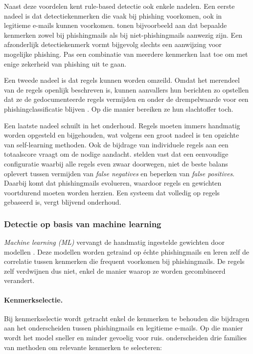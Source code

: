 Naast deze voordelen kent rule-based detectie ook enkele nadelen. Een eerste nadeel is dat detectiekenmerken die vaak bij phishing voorkomen, ook in legitieme e-mails kunnen voorkomen. \textcite{Fette2007} tonen bijvoorbeeld aan dat bepaalde kenmerken zowel bij phishingmails als bij niet-phishingmails aanwezig zijn. Een afzonderlijk detectiekenmerk vormt bijgevolg slechts een aanwijzing voor mogelijke phishing. Pas een combinatie van meerdere kenmerken laat toe om met enige zekerheid van phishing uit te gaan.

Een tweede nadeel is dat regels kunnen worden omzeild. Omdat het merendeel van de regels openlijk beschreven is, kunnen aanvallers hun berichten zo opstellen dat ze de gedocumenteerde regels vermijden en onder de drempelwaarde voor een phishingclassificatie blijven \autocite{Biggio2017}. Op die manier bereiken ze hun slachtoffer toch.

Een laatste nadeel schuilt in het onderhoud. Regels moeten immers handmatig worden opgesteld en bijgehouden, wat volgens \textcite{Sebastiani2001} een groot nadeel is ten opzichte van self-learning methoden. Ook de bijdrage van individuele regels aan een totaalscore vraagt om de nodige aandacht. \textcite{Basnet2012} stelden vast dat een eenvoudige configuratie waarbij alle regels even zwaar doorwegen, niet de beste balans oplevert tussen vermijden van \emph{false negatives} en beperken van \emph{false positives}. Daarbij komt dat phishingmails evolueren, waardoor regels en gewichten voortdurend moeten worden herzien. Een systeem dat volledig op regels gebaseerd is, vergt blijvend onderhoud.

\subsubsection{Detectie op basis van machine learning}
\label{subsubsec:machinelearning-detectie}

\emph{Machine learning (ML)} vervangt de handmatig ingestelde gewichten door modellen \autocite{Salloum2022}. Deze modellen worden getraind op échte phishingmails en leren zelf de correlatie tussen kenmerken die frequent voorkomen bij phishingmails. De regels zelf verdwijnen dus niet, enkel de manier waarop ze worden gecombineerd verandert.

\paragraph{Kenmerkselectie.}
Bij kenmerkselectie wordt getracht enkel de kenmerken te behouden die bijdragen aan het onderscheiden tussen phishingmails en legitieme e-mails. Op die manier wordt het model sneller en minder gevoelig voor ruis. \textcite{Guyon2003} onderscheiden drie families van methoden om relevante kenmerken te selecteren:

